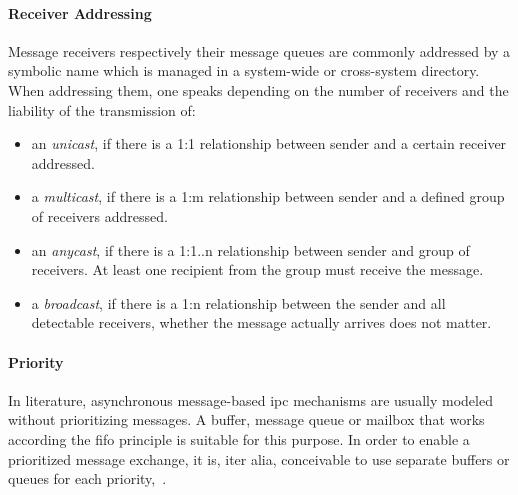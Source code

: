 \paragraph{Receiver Addressing}
Message receivers respectively their message queues are commonly addressed by a symbolic name which is managed in a system-wide or cross-system directory.
When addressing them, one speaks depending on the number of receivers and the liability of the transmission of:
\begin{itemize}
    \item an \textit{unicast}, if there is a 1:1 relationship between sender and a certain receiver addressed.
    \item a \textit{multicast}, if there is a 1:m relationship between sender and a defined group of receivers addressed.
    \item an \textit{anycast}, if there is a 1:1..n relationship between sender and group of receivers. At least one recipient from the group must receive the message.
    \item a \textit{broadcast}, if there is a 1:n relationship between the sender and all detectable receivers, whether the message actually arrives does not matter\cite{glatz2015betriebssysteme}.
\end{itemize}

\paragraph{Priority}
In literature, asynchronous message-based \ac{ipc} mechanisms are usually modeled without prioritizing messages.
A buffer, message queue or mailbox that works according the \ac{fifo} principle is suitable for this purpose.
In order to enable a prioritized message exchange, it is, iter alia, conceivable to use separate buffers or queues for each priority\cite{glatz2015betriebssysteme},~\cite{tanenbaum-modern-operating-systems}.


